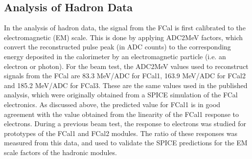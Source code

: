 \subsection{Analysis of Hadron Data}




In the analysis of hadron data, the signal from the FCal is first calibrated to the electromagnetic (EM) scale. This is done by applying ADC2MeV factors, which convert the reconstructed pulse peak (in ADC counts) to the corresponding energy deposited in the calorimeter by an electromagnetic particle (i.e. an electron or photon). For the beam test, the ADC2MeV values used to reconstruct signals from the FCal are 83.3 MeV/ADC for FCal1, 163.9 MeV/ADC for FCal2 and 185.2 MeV/ADC for  FCal3. These are the same values used in the published analysis\cite{FCal_paper}, which were originally obtained from a SPICE simulation of the FCal electronics. As discussed above, the predicted value for FCal1 is in good agreement with the value obtained from the linearity of the FCal1 response to electrons. During a previous beam test\cite{TB98_electron_signals}, the response to electrons was studied for prototypes of the FCal1 and FCal2 modules. The ratio of these responses was measured from this data, and used to validate the SPICE predictions for the EM scale factors of the hadronic modules.

%


